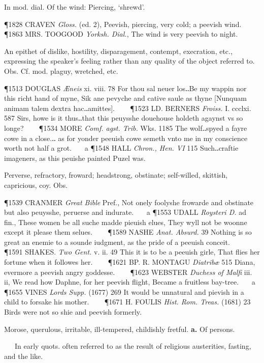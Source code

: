 \begin{description}[wide, labelwidth=!, labelindent=0pt]
\begin{myenumerate}
 In mod. dial. Of the wind: Piercing, ‘shrewd’.

\P 1828 CRAVEN  \textit{Gloss.} (ed. 2), Peevish, piercing, very cold; a peevish wind.    
\P 1863 MRS. TOOGOOD  \textit{Yorksh. Dial.}, The wind is very peevish to night.

 An epithet of dislike, hostility, disparagement, contempt, execration, etc., expressing the speaker's feeling rather than any quality of the object referred to. Obs. Cf. mod. plaguy, wretched, etc.

\P 1513 DOUGLAS  \textit{Æneis} xi. viii. 78 For thou sal neuer los‥Be my wappin nor this richt hand of myne, Sik ane pevyche and cative saule as thyne [Nunquam animam talem dextra hac‥amittes].    
\P 1523 LD. BERNERS  \textit{Froiss.} I. ccclxi. 587 Sirs, howe is it thus‥that this peuysshe douehouse holdeth agaynst vs so longe?    
\P 1534 MORE  \textit{Comf. agst. Trib.} Wks. 1185 The  wolf‥spyed a fayre cowe in a close.‥ as for yonder peeuish cowe semeth vnto me in my conscience worth not half a grot.    a 
\P 1548 HALL  \textit{Chron., Hen. VI} 115 Such‥craftie imageners, as this peuishe painted Puzel was.

 Perverse, refractory, froward; headstrong, obstinate; self-willed, skittish, capricious, coy. Obs.

\P 1539 CRANMER  \textit{Great Bible} Pref., Not onely foolyshe frowarde and obstinate but also peuysshe, peruerse and indurate.    a 
\P 1553 UDALL  \textit{Roysteri D.} ad fin., These women be all suche madde pieuish elues, They wyll not be woonne except it please them selues.    
\P 1589 NASHE  \textit{Anat. Absurd.} 39 Nothing is so great an enemie to a sounde iudgment, as the pride of a peeuish conceit.    
\P 1591 SHAKES.  \textit{Two Gent.} v. ii. 49 This it is to be a peeuish girle, That flies her fortune when it followes her.    
\P 1621 BP. R. MONTAGU  \textit{Diatribæ} 515 Diana, evermore a peevish angry goddesse.    
\P 1623 WEBSTER  \textit{Duchess of Malfi} iii. ii, We read how Daphne, for her peevish flight, Became a fruitless bay-tree.    a 
\P 1655 VINES  \textit{Lords Supp.} (1677) 269 It would be unnatural and pievish in a child to forsake his mother.    
\P 1671 H. FOULIS  \textit{Hist. Rom. Treas.} (1681) 23 Birds were not so shie and peevish formerly.

 Morose, querulous, irritable, ill-tempered, childishly fretful. \textbf{a.} Of persons.

   In early quots. often referred to as the result of religious austerities, fasting, and the like.


\end{myenumerate}
\end{description}
